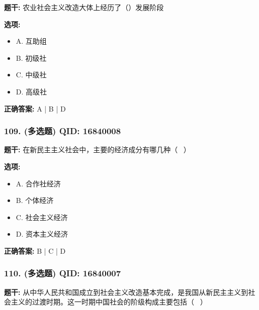 \documentclass[12pt,UTF8]{ctexart}
\begin{document}
\textbf{题干:}
农业社会主义改造大体上经历了（）发展阶段

\textbf{选项:}
\begin{itemize}[leftmargin=*]

  \item A. 互助组

  \item B. 初级社

  \item C. 中级社

  \item D. 高级社

\end{itemize}

\textbf{正确答案:}
A | B | D

\vspace{0.3em}\hrulefill\vspace{0.7em}

\subsubsection*{109. (多选题) \small QID: 16840008}

\textbf{题干:}
在新民主主义社会中，主要的经济成分有哪几种（  ）

\textbf{选项:}
\begin{itemize}[leftmargin=*]

  \item A. 合作社经济

  \item B. 个体经济

  \item C. 社会主义经济

  \item D. 资本主义经济

\end{itemize}

\textbf{正确答案:}
B | C | D

\vspace{0.3em}\hrulefill\vspace{0.7em}

\subsubsection*{110. (多选题) \small QID: 16840007}

\textbf{题干:}
从中华人民共和国成立到社会主义改造基本完成，是我国从新民主主义到社会主义的过渡时期。这一时期中国社会的阶级构成主要包括（  ）
\end{document}

